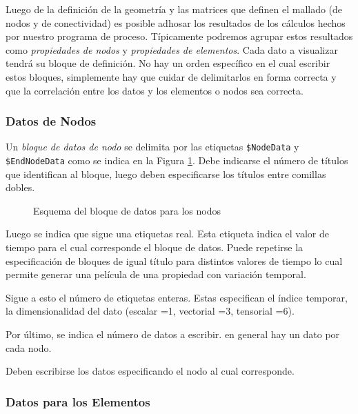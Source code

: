 
Luego de la definición de la geometría y 
las matrices que definen el mallado 
(de nodos y de conectividad) es posible 
adhosar los resultados de los cálculos
hechos por nuestro programa de proceso. 
Típicamente podremos agrupar estos 
resultados como \emph{propiedades de nodos}
y \emph{propiedades de elementos}. Cada dato 
a visualizar tendrá su bloque de 
definición. No hay un orden específico en el cual 
escribir estos bloques, simplemente hay que cuidar
de delimitarlos en forma correcta y que la correlación
entre los datos y los elementos o nodos sea correcta. 

\subsubsection{Datos de Nodos}

Un \emph{bloque de datos de nodo} se delimita por las
etiquetas \texttt{\$NodeData} y \texttt{\$EndNodeData}
como se indica en la Figura \ref{FiguraDatosNodos}.
Debe indicarse el número de títulos que identifican
al bloque, luego deben especificarse los títulos 
entre comillas dobles. 

\begin{figure}

  \caption{Esquema del bloque de datos para los nodos
  \label{FiguraDatosNodos}}

\end{figure}

Luego se indica que sigue una etiquetas real. Esta 
etiqueta indica el valor de tiempo para el cual 
corresponde el bloque de datos. Puede repetirse la 
especificación de bloques de igual título para 
distintos valores de tiempo lo cual permite generar 
una película de una propiedad con variación temporal.

Sigue a esto el número de etiquetas enteras. Estas 
especifican el índice temporar, la dimensionalidad del
dato (escalar =1, vectorial =3, tensorial =6). 

Por último, se indica el número de datos a escribir.
en general hay un dato por cada nodo. 

Deben escribirse los datos especificando el nodo al
cual corresponde. 

\subsubsection{Datos para los Elementos}

